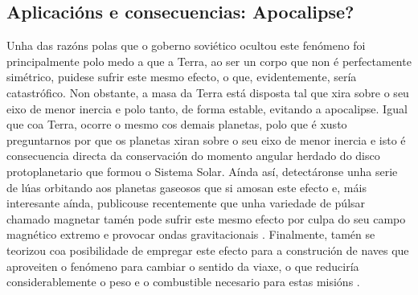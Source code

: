 \begin{refsection}
\begin{multicols}{2}
\subsection*{Aplicacións e consecuencias: Apocalipse?}

Unha das razóns polas que o goberno soviético ocultou este fenómeno foi
principalmente polo medo a que a Terra, ao ser un corpo que non é perfectamente
simétrico, puidese sufrir este mesmo efecto, o que, evidentemente, sería
catastrófico. Non obstante, a masa da Terra está disposta tal que xira sobre o
seu eixo de menor inercia e polo tanto, de forma estable, evitando a
apocalipse. Igual que coa Terra, ocorre o mesmo cos demais planetas, polo que é
xusto preguntarnos por que os planetas xiran sobre o seu eixo de menor inercia
e isto é consecuencia directa da conservación do momento angular herdado do
disco protoplanetario que formou o Sistema Solar. Aínda así, detectáronse unha
serie de lúas orbitando aos planetas gaseosos que si amosan este efecto e, máis
interesante aínda, publicouse recentemente que unha variedade de púlsar chamado
magnetar tamén pode sufrir este mesmo efecto por culpa do seu campo magnético
extremo e provocar ondas gravitacionais \cite{Kantor2023}. Finalmente, tamén se
teorizou coa posibilidade de empregar este efecto para a construción de naves
que aproveiten o fenómeno para cambiar o sentido da viaxe, o que reduciría
considerablemente o peso e o combustible necesario para estas misións
\cite{Ono2022}.

\printbibliography

\end{multicols}
\end{refsection}
